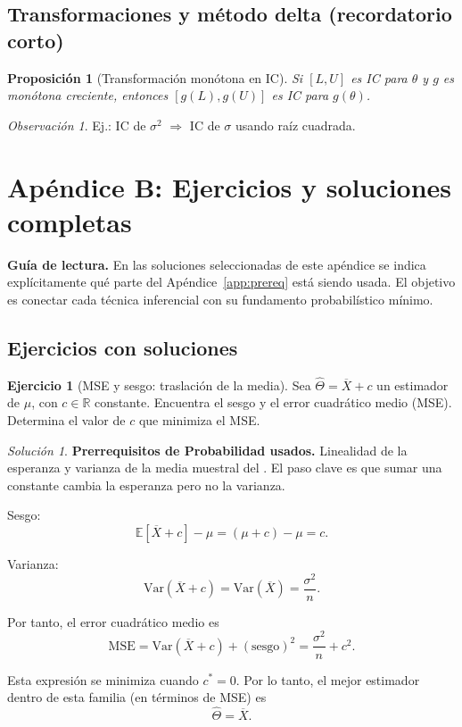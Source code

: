 \documentclass[11pt]{article}
\theoremstyle{plain}
\newtheorem{proposition}[theorem]{Proposición}
\theoremstyle{definition}
\newtheorem{exercise}[theorem]{Ejercicio}
\theoremstyle{remark}
\newtheorem{remark}[theorem]{Observación}
\theoremstyle{solstyle}
\newtheorem*{solution}{Solución}
\newcommand{\1}{\mathbbm{1}}
\begin{document}
\subsection{Transformaciones y método delta (recordatorio corto)}\label{app:prereq-transform}

\begin{proposition}[Transformación monótona en IC]
Si $[L,U]$ es IC para $\theta$ y $g$ es monótona creciente, entonces $[g(L),g(U)]$ es IC para $g(\theta)$.
\end{proposition}

\begin{remark}
Ej.: IC de $\sigma^2$ $\Rightarrow$ IC de $\sigma$ usando raíz cuadrada.
\end{remark}

\section{Apéndice B: Ejercicios y soluciones completas}

\noindent\textbf{Guía de lectura.}
En las soluciones seleccionadas de este apéndice se indica explícitamente qué parte del
Apéndice~\ref{app:prereq} está siendo usada. El objetivo es conectar cada técnica inferencial
con su fundamento probabilístico mínimo.

\subsection{Ejercicios con soluciones}

\begin{exercise}[MSE y sesgo: traslación de la media]\label{ex:ex1}
Sea $\widehat{\Theta}=\overline{X}+c$ un estimador de $\mu$, con $c\in\mathbb{R}$ constante.
Encuentra el sesgo y el error cuadrático medio (MSE). Determina el valor de $c$ que minimiza el MSE.
\end{exercise}

\begin{solution}
\textbf{Prerrequisitos de Probabilidad usados.}
Linealidad de la esperanza y varianza de la media muestral del .
El paso clave es que sumar una constante cambia la esperanza pero no la varianza.

Sesgo:
\[
\mathbb{E}[\overline{X}+c]-\mu
=
(\mu+c)-\mu
=
c.
\]

Varianza:
\[
\mathrm{Var}(\overline{X}+c)
=
\mathrm{Var}(\overline{X})
=
\frac{\sigma^2}{n}.
\]

Por tanto, el error cuadrático medio es
\[
\mathrm{MSE}
=
\mathrm{Var}(\overline{X}+c)
+
(\mathrm{sesgo})^2
=
\frac{\sigma^2}{n}+c^2.
\]

Esta expresión se minimiza cuando $c^{*}=0$.  
Por lo tanto, el mejor estimador dentro de esta familia (en términos de MSE) es
\[
\widehat{\Theta}=\overline{X}.
\]
\end{solution}
\end{document}
